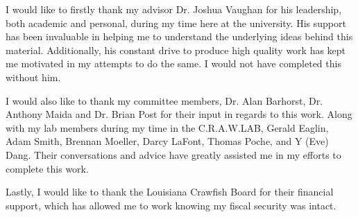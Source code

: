 \begin{acknowledgements}

I would like to firstly thank my advisor Dr. Joshua Vaughan for his leadership, both academic and personal, during my time here at the university. His support has been invaluable in helping me to understand the underlying ideas behind this material. Additionally, his constant drive to produce high quality work has kept me motivated in my attempts to do the same. I would not have completed this without him. 

I would also like to thank my committee members, Dr. Alan Barhorst, Dr. Anthony Maida and Dr. Brian Post for their input in regards to this work. Along with my lab members during my time in the C.R.A.W.LAB, Gerald Eaglin, Adam Smith, Brennan Moeller, Darcy LaFont, Thomas Poche, and Y (Eve) Dang. Their conversations and advice have greatly assisted me in my efforts to complete this work.

Lastly, I would like to thank the Louisiana Crawfish Board for their financial support, which has allowed me to work knowing my fiscal security was intact.

\end{acknowledgements}